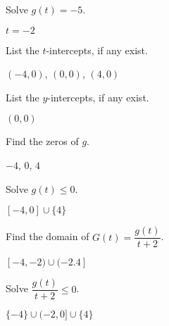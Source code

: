 \documentclass{ximera}
\begin{document}
\begin{question}
Solve $g(t) = -5$.

\begin{solution}
$t=-2$
\end{solution}

\end{question}

\begin{question}
List the $t$-intercepts, if any exist.
\begin{solution}
$(-4,0)$, $(0,0)$, $(4,0)$
\end{solution}

\end{question}

\begin{question}
List the $y$-intercepts, if any exist.

\begin{solution}
$(0,0)$

\end{solution}

\end{question}

\begin{question}
Find the zeros of $g$.
\begin{solution}
$-4$, $0$, $4$
\end{solution}

\end{question}

\begin{question}
Solve $g(t) \leq 0$.

\begin{solution}
$[-4,0] \cup \{4\}$
\end{solution}

\end{question}

\begin{question}
Find the domain of $G(t) = \dfrac{g(t)}{t+2}$.
\begin{solution}
$[-4,-2) \cup (-2.4]$

\end{solution}

\end{question}

\begin{question}
Solve $\dfrac{g(t)}{t+2} \leq 0$.

\begin{solution}
$\{-4\} \cup (-2,0] \cup \{4\}$
\end{solution}

\end{question}
\end{document}
